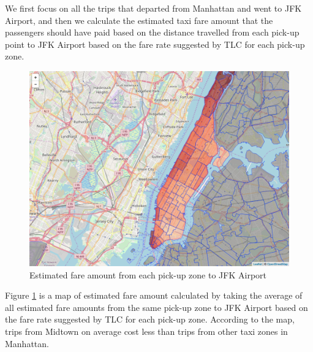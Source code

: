 \documentclass[12pt,twoside]{reedthesis}
\theoremstyle{definition}
\theoremstyle{definition}
\theoremstyle{definition}
\theoremstyle{remark}
\begin{document}
We first focus on all the trips that departed from Manhattan and went to
JFK Airport, and then we calculate the estimated taxi fare amount that
the passengers should have paid based on the distance travelled from
each pick-up point to JFK Airport based on the fare rate suggested by
TLC for each pick-up zone.
\begin{figure}[h]

{\centering \includegraphics[width=5.84in]{figure/to_jfk_fare_vis} 

}

\caption{Estimated fare amount from each pick-up zone to JFK Airport}\label{fig:to-jfk-fare-vis}
\end{figure}
Figure \ref{fig:to-jfk-fare-vis} is a map of estimated fare amount
calculated by taking the average of all estimated fare amounts from the
same pick-up zone to JFK Airport based on the fare rate suggested by TLC
for each pick-up zone. According to the map, trips from Midtown on
average cost less than trips from other taxi zones in Manhattan.
\end{document}
